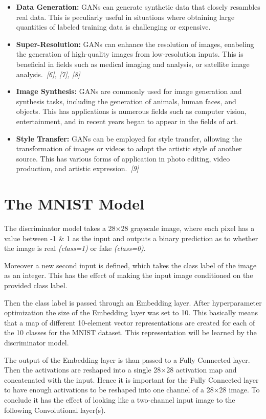 \documentclass[lettersize,journal]{IEEEtran}
\begin{document}
\begin{itemize}
    \item{\textbf{Data Generation:} GANs can generate synthetic data that closely resambles real data. This is peculiarly useful in situations where obtaining large quantities of labeled training data is challenging or expensive.}
    \item{\textbf{Super-Resolution:} GANs can enhance the resolution of images, enabeling the generation of high-quality images from low-resolution inputs. This is beneficial in fields such as medical imaging and analysis, or satellite image analysis.\ \textit{[6], [7], [8]}}
    \item{\textbf{Image Synthesis:} GANs are commonly used for image generation and synthesis tasks, including the generation of animals, human faces, and objects. This has applications is numerous fields such as computer vision, entertainment, and in recent years began to appear in the fields of art.}
    \item{\textbf{Style Transfer:} GANs can be employed for style transfer, allowing the transformation of images or videos to adopt the artistic style of another source. This has various forms of application in photo editing, video production, and artistic expression.\ \textit{[9]}}
\end{itemize}


\section{The MNIST Model}

The discriminator model takes a 28$\times$28 grayscale image, where each pixel has a value between -1 \& 1 as the input and outputs a binary prediction as to whether the image is real \textit{(class=1)} or fake \textit{(class=0)}.

Moreover a new second input is defined, which takes the class label of the image as an integer. This has the effect of making the input image conditioned on the provided class label.

Then the class label is passed through an Embedding layer. After hyperparameter optimization the size of the Embedding layer was set to 10. This basically means that a map of different 10-element vector representations are created for each of the 10 classes for the MNIST dataset. This representation will be learned by the discriminator model.

The output of the Embedding layer is than passed to a Fully Connected layer. Then the activations are reshaped into a single 28$\times$28 activation map and concatenated with the input. Hence it is important for the Fully Connected layer to have enough activations to be reshaped into one channel of a 28$\times$28 image. To conclude it has the effect of looking like a two-channel input image to the following Convolutional layer(s).
\end{document}
